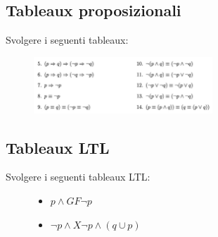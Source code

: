 \documentclass[12pt,a4paper]{article}
\begin{document}
    \subsection{Tableaux proposizionali}
    \begin{Exercise}
    Svolgere i seguenti tableaux:
        \begin{figure}[h!]
            \centering
            \includegraphics[width=0.6\textwidth]{images/esTableaux.jpeg}
            \label{fig:esTableaux1}
        \end{figure}
    \end{Exercise}
    
    \subsection{Tableaux LTL}
    \begin{Exercise}
    Svolgere i seguenti tableaux LTL:
        \begin{figure}[h!]
            \begin{itemize}
            \item \(p \land GF \neg p\)
            \item $\neg p \land X \neg p \land (q \cup p)$
        \end{itemize}
        \end{figure}
    \end{Exercise}
    
\end{document}
